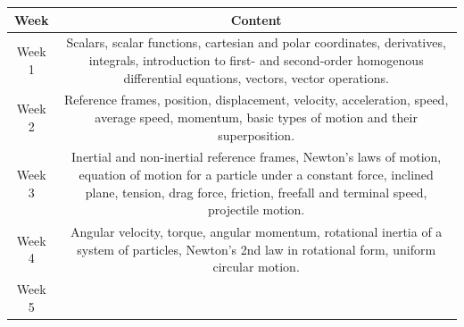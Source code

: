 \documentclass[11pt]{article}
\begin{document}
\begin{table}[h!]
\normalsize %
\begin{tabular}{ | c | c | }
\hline
\textbf{Week} & \textbf{Content} \\
\hline
Week 1 & \begin{minipage}{.85\textwidth}

	\vspace{1mm}
	Scalars, scalar functions, cartesian and polar coordinates, derivatives, integrals, introduction to first- and second-order homogenous differential equations, vectors, vector operations.
	\vspace{1mm}

\end{minipage} \\
\hline
Week 2 & \begin{minipage}{.85\textwidth}

	\vspace{1mm}
	Reference frames, position, displacement, velocity, acceleration, speed, average speed, momentum, basic types of motion and their superposition.
	\vspace{1mm}

\end{minipage} \\
\hline
Week 3 & \begin{minipage}{.85\textwidth}

	\vspace{1mm}
	Inertial and non-inertial reference frames, Newton's laws of motion, equation of motion for a particle under a constant force, inclined plane, tension, drag force, friction, freefall and terminal speed, projectile motion.
	\vspace{1mm}

\end{minipage} \\
\hline
Week 4 & \begin{minipage}{.85\textwidth}

	\vspace{1mm}
	Angular velocity, torque, angular momentum, rotational inertia of a system of particles, Newton's 2nd law in rotational form, uniform circular motion.
	\vspace{1mm}

\end{minipage} \\
\hline
Week 5 & \begin{minipage}{.85\textwidth}


\end{minipage}
\end{tabular}
\end{table}
\end{document}
